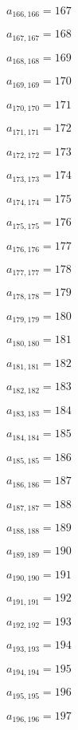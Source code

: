 \documentclass[a4paper,12pt]{article}
\begin{document}
$a _{ 166, 166 } = 167$

$a _{ 167, 167 } = 168$

$a _{ 168, 168 } = 169$

$a _{ 169, 169 } = 170$

$a _{ 170, 170 } = 171$

$a _{ 171, 171 } = 172$

$a _{ 172, 172 } = 173$

$a _{ 173, 173 } = 174$

$a _{ 174, 174 } = 175$

$a _{ 175, 175 } = 176$

$a _{ 176, 176 } = 177$

$a _{ 177, 177 } = 178$

$a _{ 178, 178 } = 179$

$a _{ 179, 179 } = 180$

$a _{ 180, 180 } = 181$

$a _{ 181, 181 } = 182$

$a _{ 182, 182 } = 183$

$a _{ 183, 183 } = 184$

$a _{ 184, 184 } = 185$

$a _{ 185, 185 } = 186$

$a _{ 186, 186 } = 187$

$a _{ 187, 187 } = 188$

$a _{ 188, 188 } = 189$

$a _{ 189, 189 } = 190$

$a _{ 190, 190 } = 191$

$a _{ 191, 191 } = 192$

$a _{ 192, 192 } = 193$

$a _{ 193, 193 } = 194$

$a _{ 194, 194 } = 195$

$a _{ 195, 195 } = 196$

$a _{ 196, 196 } = 197$
\end{document}
